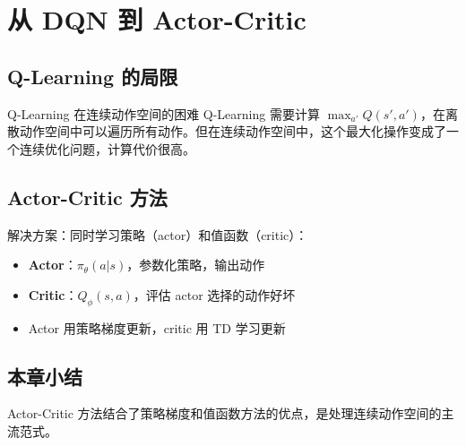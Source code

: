\section{从 DQN 到 Actor-Critic}

\subsection{Q-Learning 的局限}

\begin{warningbox}{Q-Learning 在连续动作空间的困难}
Q-Learning 需要计算 $\max_{a'} Q(s', a')$，在离散动作空间中可以遍历所有动作。但在连续动作空间中，这个最大化操作变成了一个连续优化问题，计算代价很高。
\end{warningbox}

\subsection{Actor-Critic 方法}

解决方案：同时学习策略（actor）和值函数（critic）：
\begin{itemize}
    \item \textbf{Actor}：$\pi_\theta(a|s)$，参数化策略，输出动作
    \item \textbf{Critic}：$Q_\phi(s, a)$，评估 actor 选择的动作好坏
    \item Actor 用策略梯度更新，critic 用 TD 学习更新
\end{itemize}

\subsection{本章小结}

Actor-Critic 方法结合了策略梯度和值函数方法的优点，是处理连续动作空间的主流范式。

